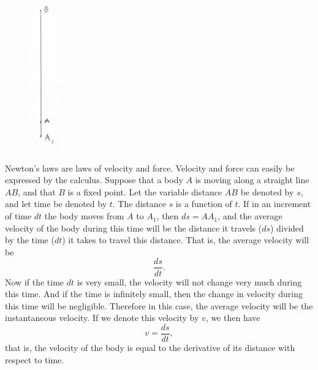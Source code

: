 \documentclass[twoside,openright]{article}
\begin{document}
\begin{figure}
  \vspace{-45pt}
  \begin{center}
    \includegraphics[width=0.12\textwidth]{fig/Figure80}
  \end{center}
  \vspace{-15pt}
\end{figure}
Newton's laws are laws of velocity and force.  Velocity and force can
easily be expressed by the calculus.  Suppose that a body $A$ is
moving along a straight line $AB$, and that $B$ is a fixed point.  Let
the variable distance $AB$ be denoted by $s$, and let time be denoted
by $t$.  The distance $s$ is a function of $t$.  If in an increment of
time $dt$ the body moves from $A$ to $A_1$, then $ds = AA_1$, and the
average velocity of the body during this time will be the distance it
travels ($ds$) divided by the time ($dt$) it takes to travel this
distance.  That is, the average velocity will be
$$\frac{ds}{dt}.$$
Now if the time $dt$ is very small, the velocity will not change very
much during this time.  And if the time is infinitely small, then the
change in velocity during this time will be negligible.  Therefore in
this case, the average velocity will be the instantaneous velocity.
If we denote this velocity by $v$, we then have
$$v = \frac{ds}{dt},$$
that is, the velocity of the body is equal to the derivative of its
distance with respect to time.
\end{document}
